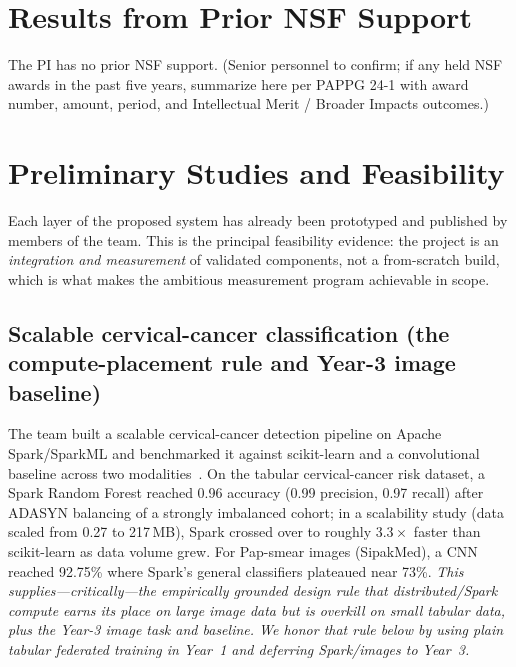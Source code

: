 \documentclass[11pt]{article}
\begin{document}
\section{Results from Prior NSF Support}
The PI has no prior NSF support. (Senior personnel to confirm; if any held NSF
awards in the past five years, summarize here per PAPPG 24-1 with award number,
amount, period, and Intellectual Merit / Broader Impacts outcomes.)

\section{Preliminary Studies and Feasibility}\label{sec:feas}
Each layer of the proposed system has already been prototyped and published by
members of the team. This is the principal feasibility evidence: the project is an
\emph{integration and measurement} of validated components, not a from-scratch
build, which is what makes the ambitious measurement program achievable in scope.

\subsection{Scalable cervical-cancer classification (the compute-placement rule and Year-3 image baseline)}
The team built a scalable cervical-cancer detection pipeline on Apache
Spark/SparkML and benchmarked it against scikit-learn and a convolutional
baseline across two modalities~\cite{cervical}. On the tabular cervical-cancer
risk dataset, a Spark Random Forest reached 0.96 accuracy (0.99 precision, 0.97
recall) after ADASYN balancing of a strongly imbalanced cohort; in a scalability
study (data scaled from 0.27 to 217\,MB), Spark crossed over to roughly
$3.3\times$ faster than scikit-learn as data volume grew. For Pap-smear images
(SipakMed), a CNN reached 92.75\% where Spark's general classifiers plateaued
near 73\%. \emph{This supplies---critically---the
empirically grounded design rule that distributed/Spark compute earns its place
on large image data but is overkill on small tabular data, plus the Year-3 image
task and baseline. We honor that rule
below by using plain tabular federated training in Year~1 and deferring
Spark/images to Year~3.}
\end{document}
